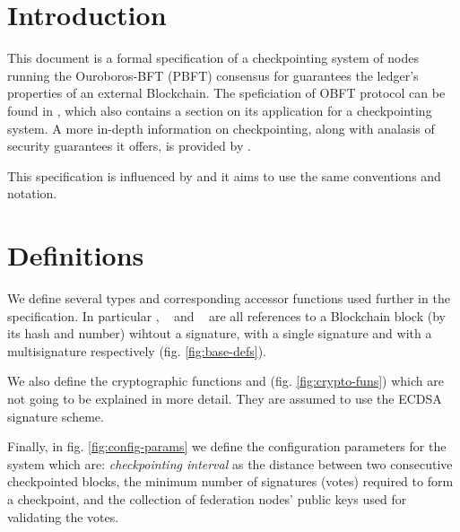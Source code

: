 \section{Introduction}

This document is a formal specification of a checkpointing system of nodes running the Ouroboros-BFT (PBFT) consensus for guarantees the ledger’s properties of an external Blockchain. The speficiation of OBFT protocol can be found in \cite{obft-paper}, which also contains a section on its application for a checkpointing system. A more in-depth information on checkpointing, along with analasis of security guarantees it offers, is provided by \cite{chkp-paper}.

This specification is influenced by \cite{ledger-spec} and it aims to use the same conventions and notation.


\section{Definitions}

We define several types and corresponding accessor functions used further in the specification. In particular \BlockRef, \Vote~ and \Chkp~ are all references to a Blockchain block (by its hash and number) wihtout a signature, with a single signature and with a multisignature respectively (fig. \ref{fig:base-defs}).

We also define the cryptographic functions  and  (fig. \ref{fig:crypto-funs}) which are not going to be explained in more detail. They are assumed to use the ECDSA signature scheme.

Finally, in fig. \ref{fig:config-params} we define the configuration parameters for the system which are: \textit{checkpointing interval} as the distance between two consecutive checkpointed blocks, the minimum number of signatures (votes) required to form a checkpoint, and the collection of federation nodes' public keys used for validating the votes.

